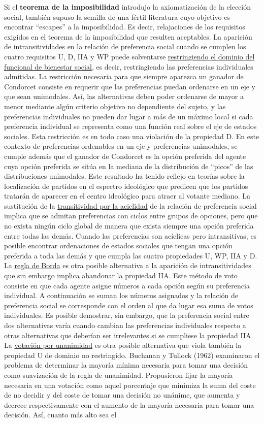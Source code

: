 \documentclass{nuevotema}
\begin{document}
Si el \textbf{teorema de la imposibilidad} introdujo la axiomatización de la elección social, también supuso la semilla de una fértil literatura cuyo objetivo es encontrar ``escapes'' a la imposibilidad. Es decir, relajaciones de los requisitos exigidos en el teorema de la imposibilidad que resulten aceptables. La aparición de intransitividades en la relación de preferencia social cuando se cumplen los cuatro requisitos U, D, IIA y WP puede solventarse \underline{restringiendo el dominio del funcional de bienestar social}, es decir, restringiendo las preferencias individuales admitidas. La restricción necesaria para que siempre aparezca un ganador de Condorcet consiste en requerir que las preferencias puedan ordenarse en un eje y que sean unimodales. Así, las alternativas deben poder ordenarse de mayor a menor mediante algún criterio objetivo no dependiente del sujeto, y las preferencias individuales no pueden dar lugar a más de un máximo local si cada preferencia individual se representa como una función real sobre el eje de estados sociales. Esta restricción es en todo caso una violación de la propiedad D. En este contexto de preferencias ordenables en un eje y preferencias unimodales, se cumple además que el ganador de Condorcet es la opción preferida del agente cuya opción preferida se sitúa en la mediana de la distribución de ``picos'' de las distribuciones unimodales. Este resultado ha tenido reflejo en teorías sobre la localización de partidos en el espectro ideológico que predicen que los partidos tratarán de aparecer en el centro ideológico para atraer al votante mediano. La sustitución de la \underline{transitividad por la aciclidad} de la relación de preferencia social implica que se admitan preferencias con ciclos entre grupos de opciones, pero que no exista ningún ciclo global de manera que exista siempre una opción preferida entre todas las demás. Cuando las preferencias son acíclicas pero intransitivas, es posible encontrar ordenaciones de estados sociales que tengan una opción preferida a toda las demás y que cumpla las cuatro propiedades U, WP, IIA y D. La \underline{regla de Borda} es otra posible alternativa a la aparición de intransitividades que sin embargo implica abandonar la propiedad IIA. Este método de voto consiste en que cada agente asigne números a cada opción según su preferencia individual. A continuación se suman los números asignados y la relación de preferencia social se corresponde con el orden al que da lugar esa suma de votos individuales. Es posible demostrar, sin embargo, que la preferencia social entre dos alternativas varía cuando cambian las preferencias individuales respecto a otras alternativas que deberían ser irrelevantes si se cumpliese la propiedad IIA. La \underline{votación por unanimidad} es otra posible alternativa que viola también la propiedad U de dominio no restringido. Buchanan y Tullock (1962) examinaron el problema de determinar la mayoría mínima necesaria para tomar una decisión como suavización de la regla de unanimidad. Propusieron fijar la mayoría necesaria en una votación como aquel porcentaje que minimiza la suma del coste de no decidir y del coste de tomar una decisión no unánime, que aumenta y decrece respectivamente con el aumento de la mayoría necesaria para tomar una decisión. Así, cuanto más alto sea el 
\end{document}
